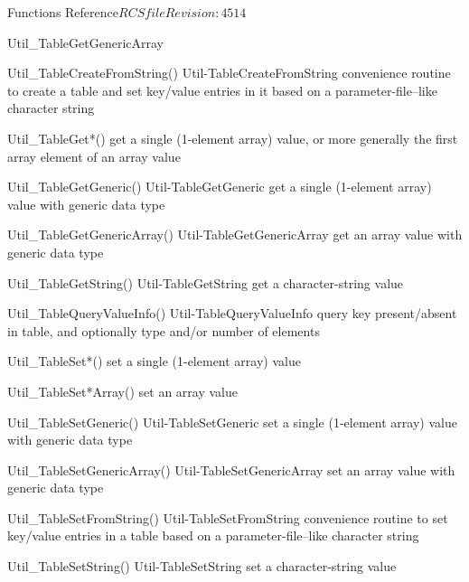 \begin{cactuspart}{ Functions Reference}{$RCSfile$}{$Revision: 4514 $}
\begin{FunctionDescription}{Util\_TableGetGenericArray}
\begin{SeeAlsoSection}
\begin{SeeAlso2} {Util\_TableCreateFromString()} {Util-TableCreateFromString}
convenience routine to create a table and set key/value entries
in it based on a parameter-file--like character string
\end{SeeAlso2}
\begin{SeeAlso}{Util\_TableGet*()}
get a single (1-element array) value,
or more generally the first array element of an array value
\end{SeeAlso}
\begin{SeeAlso2} {Util\_TableGetGeneric()} {Util-TableGetGeneric}
get a single (1-element array) value with generic data type
\end{SeeAlso2}
\begin{SeeAlso2} {Util\_TableGetGenericArray()} {Util-TableGetGenericArray}
get an array value with generic data type
\end{SeeAlso2}
\begin{SeeAlso2} {Util\_TableGetString()} {Util-TableGetString}
get a character-string value
\end{SeeAlso2}
\begin{SeeAlso2} {Util\_TableQueryValueInfo()} {Util-TableQueryValueInfo}
query key present/absent in table, and optionally type and/or number
of elements
\end{SeeAlso2}
\begin{SeeAlso}{Util\_TableSet*()}
set a single (1-element array) value
\end{SeeAlso}
\begin{SeeAlso}{Util\_TableSet*Array()}
set an array value
\end{SeeAlso}
\begin{SeeAlso2} {Util\_TableSetGeneric()} {Util-TableSetGeneric}
set a single (1-element array) value with generic data type
\end{SeeAlso2}
\begin{SeeAlso2} {Util\_TableSetGenericArray()} {Util-TableSetGenericArray}
set an array value with generic data type
\end{SeeAlso2}
\begin{SeeAlso2} {Util\_TableSetFromString()} {Util-TableSetFromString}
convenience routine to set key/value entries in a table based on a
parameter-file--like character string
\end{SeeAlso2}
\begin{SeeAlso2} {Util\_TableSetString()} {Util-TableSetString}
set a character-string value
\end{SeeAlso2}
\end{SeeAlsoSection}


\end{FunctionDescription}
\end{cactuspart}
